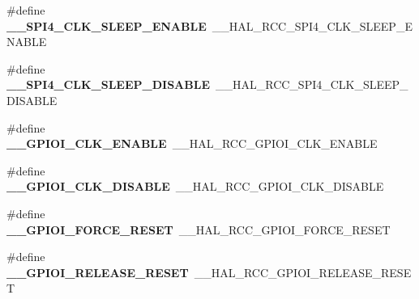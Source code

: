 \begin{DoxyCompactItemize}
\item 
\hypertarget{group___h_a_l___r_c_c___aliased_ga9a82b81c574e15e53a930f9c8b127bf1}{\#define {\bfseries \-\_\-\-\_\-\-S\-P\-I4\-\_\-\-C\-L\-K\-\_\-\-S\-L\-E\-E\-P\-\_\-\-E\-N\-A\-B\-L\-E}~\-\_\-\-\_\-\-H\-A\-L\-\_\-\-R\-C\-C\-\_\-\-S\-P\-I4\-\_\-\-C\-L\-K\-\_\-\-S\-L\-E\-E\-P\-\_\-\-E\-N\-A\-B\-L\-E}\label{group___h_a_l___r_c_c___aliased_ga9a82b81c574e15e53a930f9c8b127bf1}

\item 
\hypertarget{group___h_a_l___r_c_c___aliased_ga8b79d6fbaf0e6f31f8f4dfccc92fef26}{\#define {\bfseries \-\_\-\-\_\-\-S\-P\-I4\-\_\-\-C\-L\-K\-\_\-\-S\-L\-E\-E\-P\-\_\-\-D\-I\-S\-A\-B\-L\-E}~\-\_\-\-\_\-\-H\-A\-L\-\_\-\-R\-C\-C\-\_\-\-S\-P\-I4\-\_\-\-C\-L\-K\-\_\-\-S\-L\-E\-E\-P\-\_\-\-D\-I\-S\-A\-B\-L\-E}\label{group___h_a_l___r_c_c___aliased_ga8b79d6fbaf0e6f31f8f4dfccc92fef26}

\item 
\hypertarget{group___h_a_l___r_c_c___aliased_gac43fbb6a098998ec56d389906b708b8c}{\#define {\bfseries \-\_\-\-\_\-\-G\-P\-I\-O\-I\-\_\-\-C\-L\-K\-\_\-\-E\-N\-A\-B\-L\-E}~\-\_\-\-\_\-\-H\-A\-L\-\_\-\-R\-C\-C\-\_\-\-G\-P\-I\-O\-I\-\_\-\-C\-L\-K\-\_\-\-E\-N\-A\-B\-L\-E}\label{group___h_a_l___r_c_c___aliased_gac43fbb6a098998ec56d389906b708b8c}

\item 
\hypertarget{group___h_a_l___r_c_c___aliased_gaec33167cdc798a48f031e5f06b449e6d}{\#define {\bfseries \-\_\-\-\_\-\-G\-P\-I\-O\-I\-\_\-\-C\-L\-K\-\_\-\-D\-I\-S\-A\-B\-L\-E}~\-\_\-\-\_\-\-H\-A\-L\-\_\-\-R\-C\-C\-\_\-\-G\-P\-I\-O\-I\-\_\-\-C\-L\-K\-\_\-\-D\-I\-S\-A\-B\-L\-E}\label{group___h_a_l___r_c_c___aliased_gaec33167cdc798a48f031e5f06b449e6d}

\item 
\hypertarget{group___h_a_l___r_c_c___aliased_ga26e794bff0014f0fd53afed5a5aa2979}{\#define {\bfseries \-\_\-\-\_\-\-G\-P\-I\-O\-I\-\_\-\-F\-O\-R\-C\-E\-\_\-\-R\-E\-S\-E\-T}~\-\_\-\-\_\-\-H\-A\-L\-\_\-\-R\-C\-C\-\_\-\-G\-P\-I\-O\-I\-\_\-\-F\-O\-R\-C\-E\-\_\-\-R\-E\-S\-E\-T}\label{group___h_a_l___r_c_c___aliased_ga26e794bff0014f0fd53afed5a5aa2979}

\item 
\hypertarget{group___h_a_l___r_c_c___aliased_ga33dcd5e32000cc2af55b91764ce07218}{\#define {\bfseries \-\_\-\-\_\-\-G\-P\-I\-O\-I\-\_\-\-R\-E\-L\-E\-A\-S\-E\-\_\-\-R\-E\-S\-E\-T}~\-\_\-\-\_\-\-H\-A\-L\-\_\-\-R\-C\-C\-\_\-\-G\-P\-I\-O\-I\-\_\-\-R\-E\-L\-E\-A\-S\-E\-\_\-\-R\-E\-S\-E\-T}\label{group___h_a_l___r_c_c___aliased_ga33dcd5e32000cc2af55b91764ce07218}


\end{DoxyCompactItemize}
